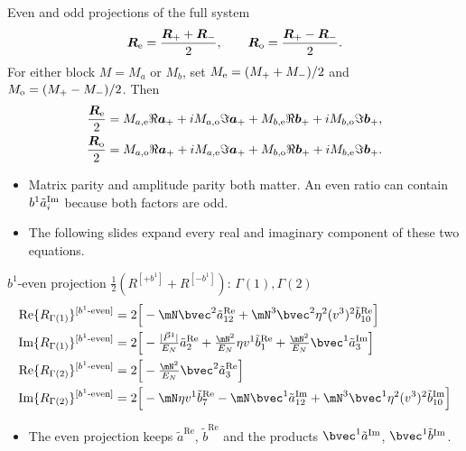 \begin{frame}{Even and odd projections of the full system}
  \[
    \boldsymbol R_{\rm e}=\frac{\boldsymbol R_++\boldsymbol R_-}{2},
    \qquad\boldsymbol R_{\rm o}=\frac{\boldsymbol R_+-\boldsymbol R_-}{2}.
  \]
  For either block $M=M_a$ or $M_b$, set
  $M_{\rm e}=(M_++M_-)/2$ and $M_{\rm o}=(M_+-M_-)/2$. Then
  \begin{align*}
  \frac{\boldsymbol R_{\rm e}}2
    &=M_{a,\rm e}\Re\boldsymbol a_+
       +iM_{a,\rm o}\Im\boldsymbol a_+
       +M_{b,\rm e}\Re\boldsymbol b_+
       +iM_{b,\rm o}\Im\boldsymbol b_+,\\
  \frac{\boldsymbol R_{\rm o}}2
    &=M_{a,\rm o}\Re\boldsymbol a_+
       +iM_{a,\rm e}\Im\boldsymbol a_+
       +M_{b,\rm o}\Re\boldsymbol b_+
       +iM_{b,\rm e}\Im\boldsymbol b_+.
  \end{align*}
  \begin{itemize}
    \item Matrix parity and amplitude parity both matter. An even ratio can contain $b^1\tilde a_i^{\rm Im}$ because both factors are odd.
    \item The following slides expand every real and imaginary component of these two equations.
  \end{itemize}
\end{frame}

\begin{frame}{$b^1$-even projection $\tfrac12(R^{[+b^1]}+R^{[-b^1]})$: $\Gamma(1),\Gamma(2)$}
  \small
  \begin{align*}
    \Rr{Re}{1}{b^1\text{-even}}&=2\Big[-\mN\bvec^2\aR{12}+\mN^3\bvec^2\eta^2(v^3)^2\bR{10}\Big]\\
    \Rr{Im}{1}{b^1\text{-even}}&=2\Big[-\tfrac{\Pa}{\En}\aR2+\tfrac{\mN^2}{\En}\eta v^1\bR1+\tfrac{\mN^2}{\En}\bvec^1\aI3\Big]\\
    \Rr{Re}{2}{b^1\text{-even}}&=2\Big[-\tfrac{\mN^2}{\En}\bvec^2\aR3\Big]\\
    \Rr{Im}{2}{b^1\text{-even}}&=2\Big[-\mN\eta v^1\bR7-\mN\bvec^1\aI{12}+\mN^3\bvec^1\eta^2(v^3)^2\bI{10}\Big]
  \end{align*}
  \begin{itemize}
    \item The even projection keeps $\tilde a^{\text{Re}}$, $\tilde b^{\text{Re}}$ and the products $\bvec^1\tilde a^{\text{Im}}$, $\bvec^1\tilde b^{\text{Im}}$.
  \end{itemize}
\end{frame}

